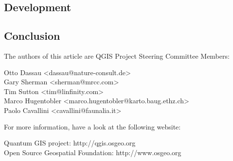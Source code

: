 \subsection{Development}

\subsection{Conclusion}


The authors of this article are QGIS Project Steering Committee Members:

Otto Dassau <dassau@nature-consult.de>  
\\Gary Sherman <sherman@mrcc.com>
\\Tim Sutton <tim@linfinity.com>
\\Marco Hugentobler <marco.hugentobler@karto.baug.ethz.ch>
\\Paolo Cavallini <cavallini@faunalia.it>


For more information, have a look at the following website:

Quantum GIS project: http://qgis.osgeo.org
\\Open Source Geospatial Foundation: http://www.osgeo.org
 


 



